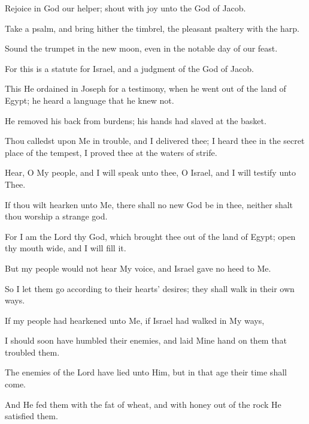 Rejoice in God our helper; shout with joy unto the God of Jacob.

Take a psalm, and bring hither the timbrel, the pleasant psaltery with the harp.

Sound the trumpet in the new moon, even in the notable day of our feast.

For this is a statute for Israel, and a judgment of the God of Jacob.

This He ordained in Joseph for a testimony, when he went out of the land of Egypt; he heard a language that he knew not.

He removed his back from burdens; his hands had slaved at the basket.

Thou calledst upon Me in trouble, and I delivered thee; I heard thee in the secret place of the tempest, I proved thee at the waters of strife.

Hear, O My people, and I will speak unto thee, O Israel, and I will testify unto Thee.

If thou wilt hearken unto Me, there shall no new God be in thee, neither shalt thou worship a strange god.

For I am the Lord thy God, which brought thee out of the land of Egypt; open thy mouth wide, and I will fill it.

But my people would not hear My voice, and Israel gave no heed to Me.

So I let them go according to their hearts' desires; they shall walk in their own ways.

If my people had hearkened unto Me, if Israel had walked in My ways,

I should soon have humbled their enemies, and laid Mine hand on them that troubled them.

The enemies of the Lord have lied unto Him, but in that age their time shall come.

And He fed them with the fat of wheat, and with honey out of the rock He satisfied them.
